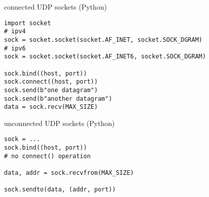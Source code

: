 \begin{frame}[fragile]{connected UDP sockets (Python)}
\begin{Verbatim}[fontsize=\small]
import socket
# ipv4
sock = socket.socket(socket.AF_INET, socket.SOCK_DGRAM)
# ipv6
sock = socket.socket(socket.AF_INET6, socket.SOCK_DGRAM)

sock.bind((host, port))
sock.connect((host, port))
sock.send(b"one datagram")
sock.send(b"another datagram")
data = sock.recv(MAX_SIZE)
\end{Verbatim}
\end{frame}

\begin{frame}[fragile]{unconnected UDP sockets (Python)}
\begin{Verbatim}[fontsize=\small]
sock = ...
sock.bind((host, port))
# no connect() operation

data, addr = sock.recvfrom(MAX_SIZE)

sock.sendto(data, (addr, port))
\end{Verbatim}
\end{frame}

